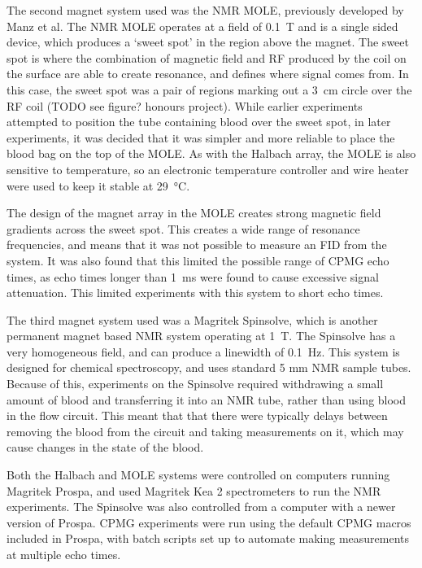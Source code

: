 The second magnet system used was the NMR MOLE, previously developed by Manz et al\cite{ManzmobileonesidedNMR2006}.
The NMR MOLE operates at a field of \SI{0.1}{T} and is a single sided device, which produces a `sweet spot' in the region above the magnet.
The sweet spot is where the combination of magnetic field and RF produced by the coil on the surface are able to create resonance, and defines where signal comes from.
In this case, the sweet spot was a pair of regions marking out a \SI{3}{cm} circle over the RF coil (TODO see figure? honours project).
While earlier experiments attempted to position the tube containing blood over the sweet spot, in later experiments, it was decided that it was simpler and more reliable to place the blood bag on the top of the MOLE.
As with the Halbach array, the MOLE is also sensitive to temperature, so an electronic temperature controller and wire heater were used to keep it stable at \SI{29}{\celsius}.

The design of the magnet array in the MOLE creates strong magnetic field gradients across the sweet spot.
This creates a wide range of resonance frequencies, and means that it was not possible to measure an FID from the system.
It was also found that this limited the possible range of CPMG echo times, as echo times longer than \SI{1}{ms} were found to cause excessive signal attenuation.
This limited experiments with this system to short echo times.

The third magnet system used was a Magritek Spinsolve, which is another permanent magnet based NMR system operating at \SI{1}{T}.
The Spinsolve has a very homogeneous field, and can produce a linewidth of \SI{0.1}{Hz}.
This system is designed for chemical spectroscopy, and uses standard 5 mm NMR sample tubes.
Because of this, experiments on the Spinsolve required withdrawing a small amount of blood and transferring it into an NMR tube, rather than using blood in the flow circuit.
This meant that that there were typically delays between removing the blood from the circuit and taking measurements on it, which may cause changes in the state of the blood.

Both the Halbach and MOLE systems were controlled on computers running Magritek Prospa, and used Magritek Kea 2 spectrometers to run the NMR experiments.
The Spinsolve was also controlled from a computer with a newer version of Prospa.
CPMG experiments were run using the default CPMG macros included in Prospa, with batch scripts set up to automate making measurements at multiple echo times.

